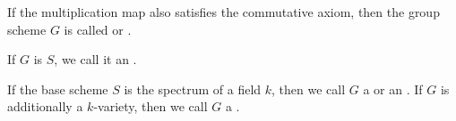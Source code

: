 \begin{definition}
If the multiplication map also satisfies the commutative axiom, then the group scheme $G$ is called  or .

If $G$ is  $S$, we call it an .

If the base scheme $S$ is the spectrum of a field $k$, then we call $G$ a  or an . If $G$ is additionally a $k$-variety, then we call $G$ a .
\end{definition}




